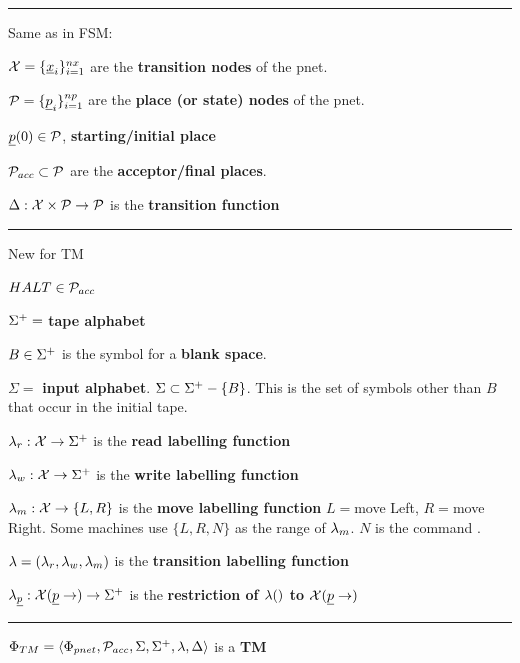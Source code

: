 \hrule
Same as in FSM:

$\calx =\{\rvx_i\}_{i=1}^{nx}$ are the {\bf transition nodes} of the pnet.

$\calp =\{\rvp_i\}_{i=1}^{np}$ are the {\bf place (or state) nodes} of the pnet.

$\rvp(0)\in \calp$, {\bf starting/initial place }

${\cal P}_{acc}\subset {\cal P}$ are the 
{\bf acceptor/final places}. 

$\Delta:{\cal X}\times{\cal P}\rightarrow {\cal P}$ is the 
{\bf transition function}
\hrule
New for TM

$HALT\in {\cal P}_{acc}$

$\Sigma^+ =$ {\bf tape alphabet}

$B\in \Sigma^+$ is the  symbol for a {\bf blank space}.

$\Sigma=$ {\bf input alphabet}. $\Sigma\subset\Sigma^+-\{B\}$. 
This is the set of symbols other than $B$ that occur in the 
initial tape.

$\lambda_{r}:{\cal X}\rightarrow \Sigma^+$ is the {\bf read  labelling function}

$\lambda_{w}:{\cal X}\rightarrow \Sigma^+$ is the {\bf write  labelling function}

$\lambda_{m}:{\cal X}\rightarrow \{L,R\}$ is the {\bf move 
labelling function} $L=$move Left, $R=$move Right. Some machines use $\{L,R,N\}$
as the range of $\lambda_m$. $N$ is the command .

$\lambda = (\lambda_r, \lambda_w, \lambda_m)$ is the
{\bf transition labelling function}

$\lam_\rvp: \calx(\rvp\rarrow)\rarrow \TA$ is the
{\bf restriction of $\lambda()$ to $\calx(\rvp\rarrow)$}

\hrule
$\Phi_{TM}=\left\langle\Phi_{pnet},{\cal P}_{acc}, \Sigma,
\Sigma^+, \lambda, \Delta\right\rangle$  is a {\bf TM}



